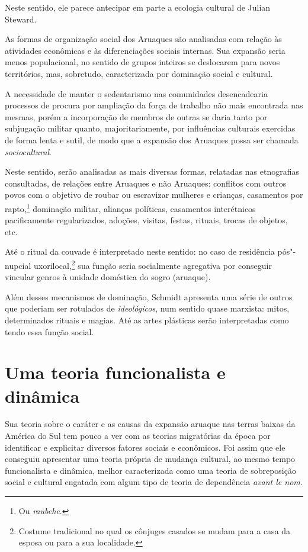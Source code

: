 \medskip
Neste sentido, ele parece antecipar em parte a
ecologia cultural de Julian Steward.

As formas de organização social dos Aruaques são analisadas com relação às atividades econômicas e às diferenciações sociais internas. Sua expansão seria menos populacional, no sentido de grupos inteiros se deslocarem para novos territórios, mas, sobretudo, caracterizada por dominação social e cultural. 

A necessidade de manter o sedentarismo nas comunidades desencadearia processos de procura por ampliação da força de trabalho não mais encontrada nas mesmas, porém a incorporação de membros de outras se daria tanto por subjugação militar quanto, majoritariamente, por influências culturais exercidas de forma lenta e sutil, de modo que a expansão dos Aruaques possa ser chamada \textit{sociocultural}. 

Neste sentido, serão analisadas as mais diversas formas, relatadas nas etnografias consultadas, de relações entre Aruaques e não Aruaques: conflitos com outros povos com o objetivo de roubar ou escravizar mulheres e crianças, casamentos por rapto,\footnote{Ou \textit{raubehe}.} dominação militar, alianças políticas, casamentos interétnicos pacificamente regularizados, adoções, visitas, festas, rituais, trocas de objetos, etc. 

Até o ritual da couvade é interpretado neste sentido: no caso de residência pós"-nupcial uxorilocal,\footnote{Costume tradicional no qual os cônjuges casados se mudam para a casa da esposa ou para a sua localidade.} sua função seria socialmente agregativa por conseguir vincular genros à unidade doméstica do sogro (aruaque).

Além desses mecanismos de dominação, Schmidt apresenta uma série de outros que poderiam ser rotulados de \textit{ideológicos}, num sentido quase marxista: mitos, determinados rituais e magias. Até as artes plásticas serão interpretadas como tendo essa função social.

\section{Uma teoria funcionalista e dinâmica}

Sua teoria sobre o caráter e as causas da expansão aruaque nas terras baixas da América do Sul tem pouco a ver com as teorias migratórias da época por identificar e explicitar diversos fatores sociais e econômicos. Foi assim que ele conseguiu apresentar uma teoria própria de mudança cultural, ao mesmo tempo funcionalista e dinâmica, melhor caracterizada como uma teoria de sobreposição social e cultural engatada com algum tipo de teoria de dependência \textit{avant le nom}. 

